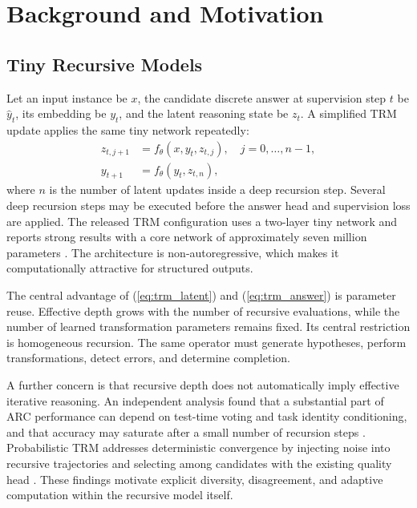 \documentclass[10pt,a4paper,twocolumn]{article}
\begin{document}
\section{Background and Motivation}
\subsection{Tiny Recursive Models}
Let an input instance be $x$, the candidate discrete answer at supervision step $t$ be $\hat y_t$, its embedding be $y_t$, and the latent reasoning state be $z_t$. A simplified TRM update applies the same tiny network repeatedly:
\begin{align}
z_{t,j+1} &= f_{\theta}(x,y_t,z_{t,j}), \quad j=0,\ldots,n-1, \label{eq:trm_latent}\\
y_{t+1} &= f_{\theta}(y_t,z_{t,n}), \label{eq:trm_answer}
\end{align}
where $n$ is the number of latent updates inside a deep recursion step. Several deep recursion steps may be executed before the answer head and supervision loss are applied. The released TRM configuration uses a two-layer tiny network and reports strong results with a core network of approximately seven million parameters \cite{jolicoeur2025trm}. The architecture is non-autoregressive, which makes it computationally attractive for structured outputs.

The central advantage of (\ref{eq:trm_latent}) and (\ref{eq:trm_answer}) is parameter reuse. Effective depth grows with the number of recursive evaluations, while the number of learned transformation parameters remains fixed. Its central restriction is homogeneous recursion. The same operator must generate hypotheses, perform transformations, detect errors, and determine completion.

A further concern is that recursive depth does not automatically imply effective iterative reasoning. An independent analysis found that a substantial part of ARC performance can depend on test-time voting and task identity conditioning, and that accuracy may saturate after a small number of recursion steps \cite{royeazar2025trmanalysis}. Probabilistic TRM addresses deterministic convergence by injecting noise into recursive trajectories and selecting among candidates with the existing quality head \cite{sghaier2026ptrm}. These findings motivate explicit diversity, disagreement, and adaptive computation within the recursive model itself.
\end{document}
